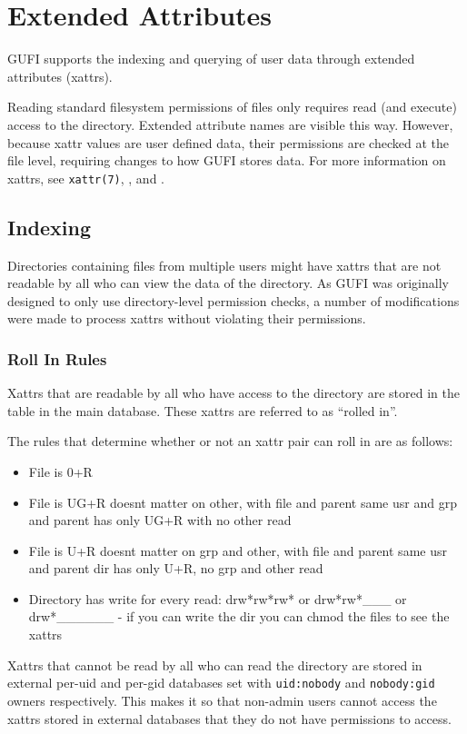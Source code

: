 \section{Extended Attributes}
\label{sec:xattrs}
GUFI supports the indexing and querying of user data through extended
attributes (xattrs).

Reading standard filesystem permissions of files only requires read
(and execute) access to the directory. Extended attribute names are
visible this way. However, because xattr values are user defined data,
their permissions are checked at the file level, requiring changes to
how GUFI stores data. For more information on xattrs, see
\texttt{xattr(7)}, \listxattr, and \getxattr.

\subsection{Indexing}
Directories containing files from multiple users might have xattrs
that are not readable by all who can view the \lstat data of the
directory. As GUFI was originally designed to only use directory-level
permission checks, a number of modifications were made to process
xattrs without violating their permissions.

\subsubsection{Roll In Rules}
Xattrs that are readable by all who have access to the directory are
stored in the \xattrspwd table in the main database. These xattrs are
referred to as ``rolled in''.

The rules that determine whether or not an xattr pair can roll in are
as follows:

\begin{itemize}
\item File is 0+R
\item File is UG+R doesnt matter on other, with file and parent same
  usr and grp and parent has only UG+R with no other read
\item File is U+R doesnt matter on grp and other, with file and parent
  same usr and parent dir has only U+R, no grp and other read
\item Directory has write for every read: drw*rw*rw* or drw*rw*\_\_\_
  or drw*\_\_\_\_\_\_ - if you can write the dir you can chmod the
  files to see the xattrs
\end{itemize}

Xattrs that cannot be read by all who can read the directory are
stored in external per-uid and per-gid databases set with
\texttt{uid:nobody} and \texttt{nobody:gid} owners respectively. This
makes it so that non-admin users cannot access the xattrs stored in
external databases that they do not have permissions to access.

